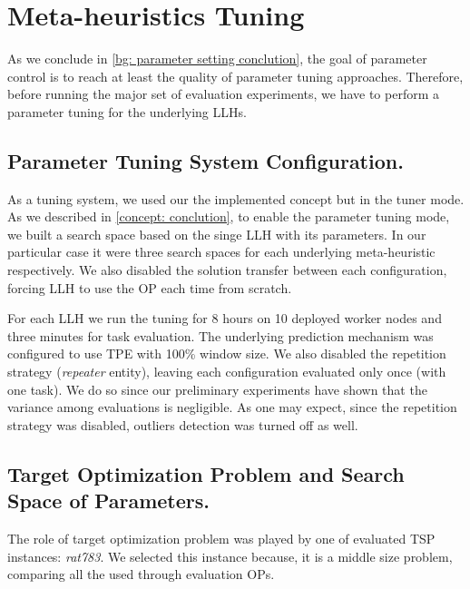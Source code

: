 \section{Meta-heuristics Tuning}\label{eval: mh tuning}
As we conclude in \cref{bg: parameter setting conclution}, the goal of parameter control is to reach at least the quality of parameter tuning approaches. Therefore, before running the major set of evaluation experiments, we have to perform a parameter tuning for the underlying LLHs.

\subsection{Parameter Tuning System Configuration.} 
As a tuning system, we used our the implemented concept but in the tuner mode. As we described in \cref{concept: conclution}, to enable the parameter tuning mode, we built a search space based on the singe LLH with its parameters. In our particular case it were three search spaces for each underlying meta-heuristic respectively. We also disabled the solution transfer between each configuration, forcing LLH to use the OP each time from scratch.

For each LLH we run the tuning for 8 hours on 10 deployed worker nodes and three minutes for task evaluation. The underlying prediction mechanism was configured to use TPE with 100\% window size. We also disabled the repetition strategy (\emph{repeater} entity), leaving each configuration evaluated only once (with one task). We do so since our preliminary experiments have shown that the variance among evaluations is negligible. As one may expect, since the repetition strategy was disabled, outliers detection was turned off as well.

\subsection{Target Optimization Problem and Search Space of Parameters.} 
The role of target optimization problem was played by one of evaluated TSP instances: \emph{rat783}. We selected this instance because, it is a middle size problem, comparing all the used through evaluation OPs.

